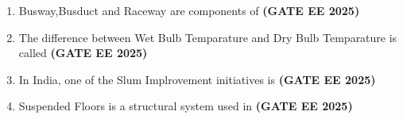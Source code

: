 \documentclass[journal,12pt,onecolumn]{IEEEtran}
\theoremstyle{remark}
\begin{document}
{\begin{enumerate}
\begin{enumerate}
    \item Perforations in the cast iron pipe used for bording
    \item Holes in retaining wall for draining water
    \item Holes in the cover plate of floor traps
    \item Holes dug in earth to recharge ground water
\end{enumerate}
\item Busway,Busduct and Raceway are components of \hfill \textbf{(GATE EE 2025)}
\begin{enumerate}
\end{enumerate}
\item The difference between Wet Bulb Temparature and Dry Bulb Temparature is called \hfill \textbf{(GATE EE 2025)}
\begin{enumerate}
\end{enumerate}
\item In India, one of the Slum Implrovement initiatives is \hfill \textbf{(GATE EE 2025)}
\begin{enumerate}
\end{enumerate}
\item Suspended Floors is a structural system used in \hfill \textbf{(GATE EE 2025)}
\begin{enumerate}

\end{enumerate}
\end{enumerate}}
\end{document}
